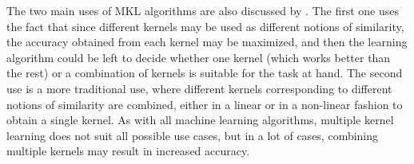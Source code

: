 The two main uses of MKL algorithms are also discussed by \cite{gonen11a}. The first one uses the fact that since different kernels may be used as different notions of similarity, the accuracy obtained from each kernel may be maximized, and then the learning algorithm could be left to decide whether one kernel (which works better than the rest) or a combination of kernels is suitable for the task at hand. The second use is a more traditional use, where different kernels corresponding to different notions of similarity are combined, either in a linear or in a non-linear fashion to obtain a single kernel. As with all machine learning algorithms, multiple kernel learning does not suit all possible use cases, but in a lot of cases, combining multiple kernels may result in increased accuracy.
